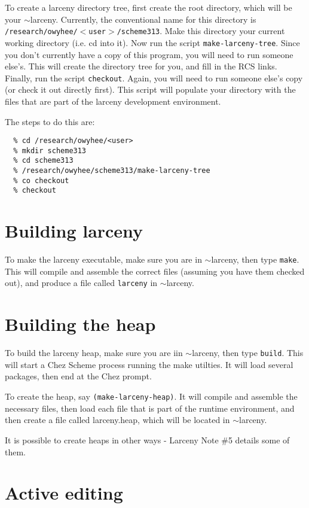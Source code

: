 To create a larceny directory tree, first create the root directory,
which will be your $\sim$larceny.  Currently, the conventional name
for this directory is {\tt /research/owyhee/$<$user$>$/scheme313}.
Make this directory your current working directory (i.e. cd into it).
Now run the script {\tt make-larceny-tree}.  Since you don't currently
have a copy of this program, you will need to run someone else's.  
This will create the directory tree for you, and fill in the RCS links.
Finally, run the script {\tt checkout}.  Again, you will need
to run someone else's copy (or check it out directly first).  This
script will populate your directory with the files that are part of
the larceny development environment.

The steps to do this are:
\begin{verbatim}
  % cd /research/owyhee/<user>
  % mkdir scheme313
  % cd scheme313
  % /research/owyhee/scheme313/make-larceny-tree
  % co checkout
  % checkout
\end{verbatim}

\section{Building larceny}

To make the larceny executable, make sure you are in $\sim$larceny,
then type {\tt make}.   This will compile and assemble the correct
files (assuming you have them checked out), and produce a file called
{\tt larceny} in $\sim$larceny.

\section{Building the heap}

To build the larceny heap, make sure you are iin $\sim$larceny, 
then type {\tt build}.  This will start a Chez Scheme process running
the make utilties.  It will load several packages, then end at
the Chez prompt.

To create the heap, say {\tt (make-larceny-heap)}.  It will compile
and assemble the necessary files, then load each file that is part
of the runtime environment, and then create a file called larceny.heap, 
which will be located in $\sim$larceny.

It is possible to create heaps in other ways - Larceny Note \#5 details
some of them.

\section{Active editing}

